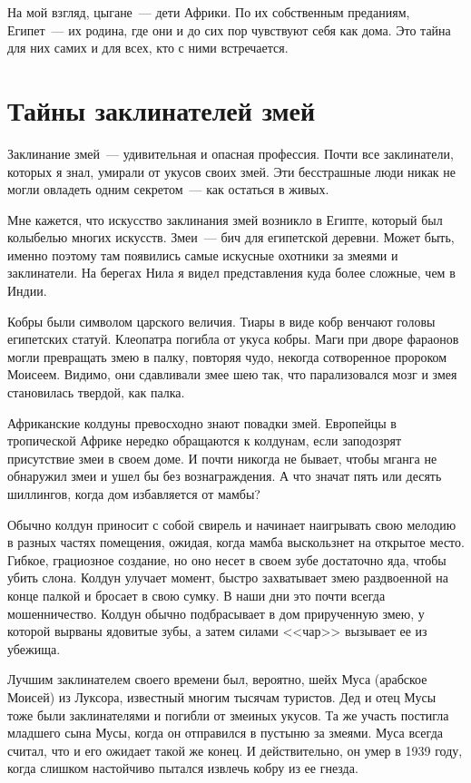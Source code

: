 \documentclass[12pt,a4paper,twoside,openany,svgnames]{memoir}
\begin{document}
На мой взгляд, цыгане~--- дети Африки. По их собственным преданиям, Египет~--- их родина, где они и до сих пор чувствуют себя как дома. Это тайна для них самих и для всех, кто с ними встречается.

\chapter{Тайны заклинателей змей}

Заклинание змей~--- удивительная и опасная профессия. Почти все заклинатели, которых я знал, умирали от укусов своих змей. Эти бесстрашные люди никак не могли овладеть одним секретом~--- как остаться в живых.

Мне кажется, что искусство заклинания змей возникло в Египте, который был колыбелью многих искусств. Змеи~--- бич для египетской деревни. Может быть, именно поэтому там появились самые искусные охотники за змеями и заклинатели. На берегах Нила я видел представления куда более сложные, чем в Индии.

Кобры были символом царского величия. Тиары в виде кобр венчают головы египетских статуй. Клеопатра погибла от укуса кобры. Маги при дворе фараонов могли превращать змею в палку, повторяя чудо, некогда сотворенное пророком Моисеем. Видимо, они сдавливали змее шею так, что парализовался мозг и змея становилась твердой, как палка.

Африканские колдуны превосходно знают повадки змей. Европейцы в тропической Африке нередко обращаются к колдунам, если заподозрят присутствие змеи в своем доме. И почти никогда не бывает, чтобы мганга не обнаружил змеи и ушел бы без вознаграждения. А что значат пять или десять шиллингов, когда дом избавляется от мамбы?

Обычно колдун приносит с собой свирель и начинает наигрывать свою мелодию в разных частях помещения, ожидая, когда мамба выскользнет на открытое место. Гибкое, грациозное создание, но оно несет в своем зубе достаточно яда, чтобы убить слона. Колдун улучает момент, быстро захватывает змею раздвоенной на конце палкой и бросает в свою сумку. В наши дни это почти всегда мошенничество. Колдун обычно подбрасывает в дом прирученную змею, у которой вырваны ядовитые зубы, а затем силами <<чар>> вызывает ее из убежища.

Лучшим заклинателем своего времени был, вероятно, шейх Муса (арабское Моисей) из Луксора, известный многим тысячам туристов. Дед и отец Мусы тоже были заклинателями и погибли от змеиных укусов. Та же участь постигла младшего сына Мусы, когда он отправился в пустыню за змеями. Муса всегда считал, что и его ожидает такой же конец. И действительно, он умер в 1939 году, когда слишком настойчиво пытался извлечь кобру из ее гнезда.
\end{document}
